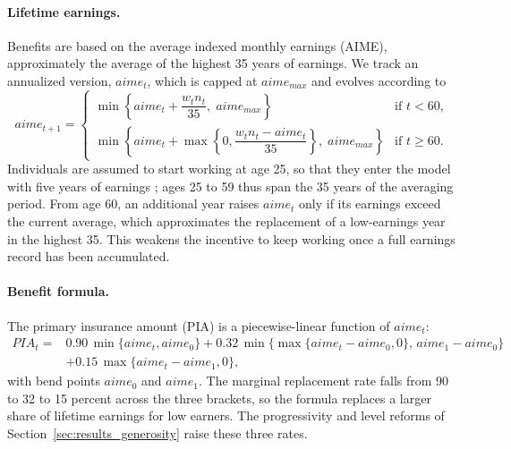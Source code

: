 \paragraph{Lifetime earnings.} Benefits are based on the average indexed monthly earnings (AIME), approximately the average of the highest 35 years of earnings. We track an annualized version, $aime_t$, which is capped at $aime_{max}$ and evolves according to
\begin{equation}\label{eq:aime}
aime_{t+1}=
\begin{cases}
\min\left\{aime_t+\dfrac{w_t n_t}{35},\; aime_{max}\right\} & \text{if } t<60,\\[2ex]
\min\left\{aime_t+\max\left\{0,\dfrac{w_t n_t-aime_t}{35}\right\},\; aime_{max}\right\} & \text{if } t\geq 60.
\end{cases}
\end{equation}
Individuals are assumed to start working at age 25, so that they enter the model with five years of earnings \citep{french2005effects}; ages 25 to 59 thus span the 35 years of the averaging period. %
 From age 60, an additional year raises $aime_t$ only if its earnings exceed the current average, which approximates the replacement of a low-earnings year in the highest 35. This weakens the incentive to keep working once a full earnings record has been accumulated.

\paragraph{Benefit formula.} The primary insurance amount (PIA) is a piecewise-linear function of $aime_t$:
\begin{equation}\label{eq:pia}
\begin{split}
PIA_t={}&0.90\,\min\{aime_t,aime_0\}+0.32\,\min\big\{\max\{aime_t-aime_0,0\},\,aime_1-aime_0\big\}\\
&+0.15\,\max\{aime_t-aime_1,0\},
\end{split}
\end{equation}
with bend points $aime_0$ and $aime_1$. The marginal replacement rate falls from 90 to 32 to 15 percent across the three brackets, so the formula replaces a larger share of lifetime earnings for low earners. The progressivity and level reforms of Section~\ref{sec:results_generosity} raise these three rates.

